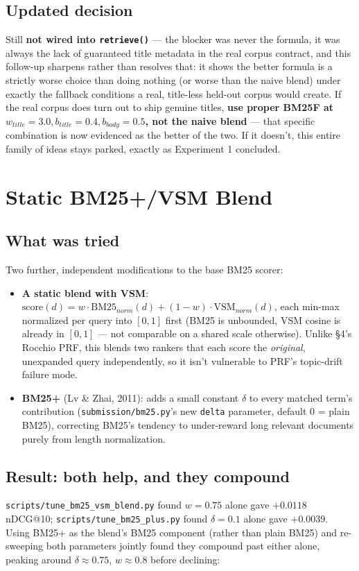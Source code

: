 \documentclass[11pt]{article}
\begin{document}
\subsection{Updated decision}
Still \textbf{not wired into \texttt{retrieve()}} --- the blocker was
never the formula, it was always the lack of guaranteed title metadata
in the real corpus contract, and this follow-up sharpens rather than
resolves that: it shows the better formula is a strictly worse choice
than doing nothing (or worse than the naive blend) under exactly the
fallback conditions a real, title-less held-out corpus would create. If
the real corpus does turn out to ship genuine titles, \textbf{use proper
BM25F at $w_{title}{=}3.0,b_{title}{=}0.4,b_{body}{=}0.5$, not the naive
blend} --- that specific combination is now evidenced as the better of
the two. If it doesn't, this entire family of ideas stays parked, exactly
as Experiment 1 concluded.

\section{Static BM25+/VSM Blend}

\subsection{What was tried}
Two further, independent modifications to the base BM25 scorer:

\begin{itemize}
\item \textbf{A static blend with VSM}: $\text{score}(d) = w \cdot
\text{BM25}_{norm}(d) + (1-w)\cdot\text{VSM}_{norm}(d)$, each min-max
normalized per query into $[0,1]$ first (BM25 is unbounded, VSM cosine
is already in $[0,1]$ --- not comparable on a shared scale otherwise).
Unlike \S 4's Rocchio PRF, this blends two rankers that each score the
\emph{original}, unexpanded query independently, so it isn't vulnerable
to PRF's topic-drift failure mode.
\item \textbf{BM25+} (Lv \& Zhai, 2011): adds a small constant $\delta$
to every matched term's contribution
(\texttt{submission/bm25.py}'s new \texttt{delta} parameter, default 0
= plain BM25), correcting BM25's tendency to under-reward long relevant
documents purely from length normalization.
\end{itemize}

\subsection{Result: both help, and they compound}
\texttt{scripts/tune\_bm25\_vsm\_blend.py} found $w{=}0.75$ alone gave
$+0.0118$ nDCG@10; \texttt{scripts/tune\_bm25\_plus.py} found
$\delta{=}0.1$ alone gave $+0.0039$. Using BM25+ as the blend's BM25
component (rather than plain BM25) and re-sweeping both parameters
jointly found they compound past either alone, peaking around
$\delta{\approx}0.75$, $w{\approx}0.8$ before declining:
\end{document}
